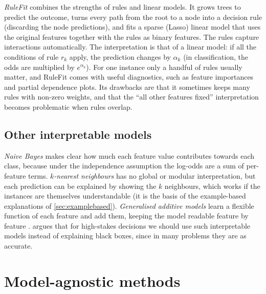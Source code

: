 \emph{RuleFit} \citep{friedman2008predictive} combines the strengths of rules and linear models. It
grows trees to predict the outcome, turns every path from the root to a node into a decision rule
(discarding the node predictions), and fits a sparse (Lasso) linear model that uses the original
features together with the rules as binary features. The rules capture interactions automatically.
The interpretation is that of a linear model: if all the conditions of rule $r_k$ apply, the
prediction changes by $\alpha_k$ (in classification, the odds are multiplied by $e^{\alpha_k}$). For
one instance only a handful of rules usually matter, and RuleFit comes with useful diagnostics,
such as feature importances and partial dependence plots. Its drawbacks are that it sometimes keeps many
rules with non-zero weights, and that the ``all other features fixed'' interpretation becomes problematic
when rules overlap.

\subsection{Other interpretable models}

\emph{Naive Bayes} makes clear how much each feature value contributes towards each class, because
under the independence assumption the log-odds are a sum of per-feature terms. \emph{$k$-nearest
neighbours} has no global or modular interpretation, but each prediction can be explained by
showing the $k$ neighbours, which works if the instances are themselves understandable (it is the
basis of the example-based explanations of \cref{sec:examplebased}). \emph{Generalised additive
models} learn a flexible function of each feature and add them, keeping the model readable feature
by feature \citep{lou2012intelligible}. \citet{rudin2019stop} argues that for high-stakes decisions we
should use such interpretable models instead of explaining black boxes, since in many problems they
are as accurate.

\section{Model-agnostic methods}\label{sec:agnostic}

